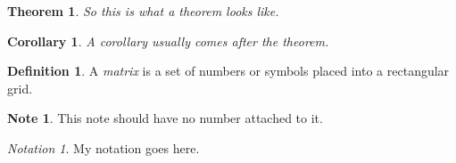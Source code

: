 \documentclass{article}
\theoremstyle{plain}
\newtheorem{theorem}{Theorem}
\newtheorem{corollary}{Corollary}
\theoremstyle{definition}
\newtheorem{definition}{Definition}
\newtheorem*{note}{Note}
\theoremstyle{remark}
\newtheorem*{notation}{Notation}
\begin{document}
\begin{theorem}
So this is what a theorem looks like.
\end{theorem}

\begin{corollary}
A corollary usually comes after the theorem.
\end{corollary}

\begin{definition}
A \textit{matrix} is a set of numbers or symbols placed into a rectangular grid.
\end{definition}

\begin{note}
This note should have no number attached to it.
\end{note}

\begin{notation}
My notation goes here.
\end{notation}
\end{document}
